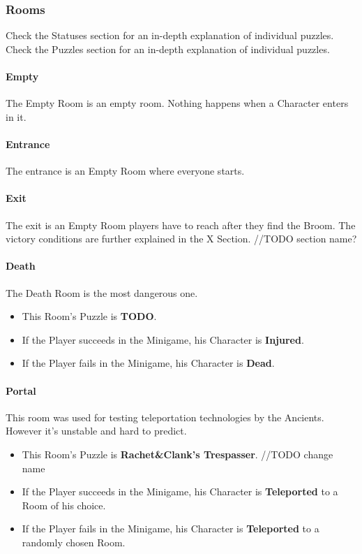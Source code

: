 \subsubsection{Rooms}

Check the Statuses section for an in-depth explanation of individual puzzles.
Check the Puzzles section for an in-depth explanation of individual puzzles.

\paragraph{Empty} The Empty Room is an empty room. Nothing happens when a Character enters in it.

\paragraph{Entrance} The entrance is an Empty Room where everyone starts.

\paragraph{Exit} The exit is an Empty Room players have to reach after they find the Broom. The victory conditions are further explained in the X Section. //TODO section name?

\paragraph{Death} The Death Room is the most dangerous one.
\begin{itemize}
	\item This Room's Puzzle is \textbf{TODO}.
	\item If the Player succeeds in the Minigame, his Character is \textbf{Injured}.
	\item If the Player fails    in the Minigame, his Character is \textbf{Dead}.
\end{itemize}

\paragraph{Portal} This room was used for testing teleportation technologies by the Ancients. However it's unstable and hard to predict.
\begin{itemize}
	\item This Room's Puzzle is \textbf{Rachet\&Clank's Trespasser}. //TODO change name
	\item If the Player succeeds in the Minigame, his Character is \textbf{Teleported} to a Room of his choice.
	\item If the Player fails    in the Minigame, his Character is \textbf{Teleported} to a randomly chosen Room.
\end{itemize}

